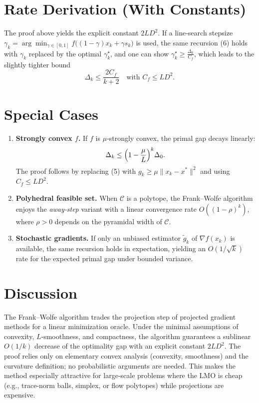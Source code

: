 \documentclass{article}
\begin{document}
\section*{Rate Derivation (With Constants)}
The proof above yields the explicit constant $2L D^{2}$.
If a line‑search stepsize $\gamma_{k}= \arg\min_{\gamma\in[0,1]}
f\bigl((1-\gamma)x_{k}+\gamma s_{k}\bigr)$ is used, the same recursion
(6) holds with $\gamma_{k}$ replaced by the optimal $\gamma_{k}^{\star}$,
and one can show $\gamma_{k}^{\star}\ge \frac{\Delta_{k}}{C_{f}}$,
which leads to the slightly tighter bound
\[
\Delta_{k}\le\frac{2C_{f}}{k+2}
\quad\text{with }C_{f}\le L D^{2}.
\]

\section*{Special Cases}
\begin{enumerate}[label=\alph*.]
\item \textbf{Strongly convex $f$.}  
If $f$ is $\mu$‑strongly convex, the primal gap decays linearly:
\[
\Delta_{k}\le\Bigl(1-\frac{\mu}{L}\Bigr)^{k}\Delta_{0}.
\]
The proof follows by replacing (5) with $g_{k}\ge\mu\|x_{k}-x^{*}\|^{2}$
and using $C_{f}\le L D^{2}$.

\item \textbf{Polyhedral feasible set.}  
When $\mathcal C$ is a polytope, the Frank–Wolfe algorithm enjoys the
\emph{away‑step} variant with a linear convergence rate
$O((1-\rho)^{k})$, where $\rho>0$ depends on the pyramidal width of
$\mathcal C$.

\item \textbf{Stochastic gradients.}  
If only an unbiased estimator $\tilde g_{k}$ of $\nabla f(x_{k})$ is
available, the same recursion holds in expectation, yielding an
$O(1/\sqrt{k})$ rate for the expected primal gap under bounded variance.
\end{enumerate}

\section*{Discussion}
The Frank–Wolfe algorithm trades the projection step of projected
gradient methods for a linear minimization oracle.  Under the minimal
assumptions of convexity, $L$‑smoothness, and compactness, the algorithm
guarantees a sublinear $O(1/k)$ decrease of the optimality gap with an
explicit constant $2L D^{2}$.  The proof relies only on elementary convex
analysis (convexity, smoothness) and the curvature definition; no
probabilistic arguments are needed.  This makes the method especially
attractive for large‑scale problems where the LMO is cheap (e.g.,
trace‑norm balls, simplex, or flow polytopes) while projections are
expensive.
\end{document}

